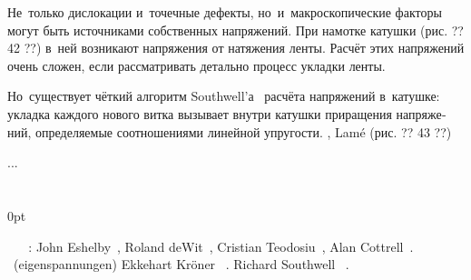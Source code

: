 
\label{section:coilwindingstress}

\begin{otherlanguage}{russian}

Не~только дислокации и~точечные дефекты, но~и~макроскопические факторы могут быть источниками собственных напряжений.
При намотке катушки (рис. ?? 42 ??) в~ней возникают напряжения от натяжения ленты.
Расчёт этих напряжений очень сложен, если рассматривать детально процесс укладки ленты.

Но~существует чёткий алгоритм Southwell’а~\cite{southwell-introductiontotheoryofelasticity} расчёта напряжений в~катушке: укладка каждого нового витка вызывает внутри катушки приращения напряжений, определяемые соотношениями линейной упругости.
,    Lam\'{e}    (рис. ?? 43 ??)

...



\end{otherlanguage}

\section*{\small \wordforbibliography}

\begin{changemargin}{\parindent}{0pt}
\fontsize{10}{12}\selectfont

 ~ ~   :
John Eshelby~\cite{eshelby-theoryofdislocations},
Roland deWit~\cite{dewit-disclinations},
Cristian Teodosiu~\cite{teodosiu-crystaldefects},
Alan Cottrell~\cite{cottrell-dislocations}.
~(eigen\-spannung\-en)
Ekkehart Kröner
~\cite{kroener-kontinuumstheorie}.
Richard Southwell
~\cite{southwell-introductiontotheoryofelasticity}.

\end{changemargin}

